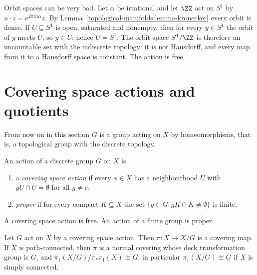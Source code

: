 \begin{counterexample}\label{topological-manifolds:counterexample-irrational-rotation}
Orbit spaces can be very bad. Let $\alpha$ be irrational and let $\ZZ$ act on $S^1$ by $n \cdot z = e^{2\pi in\alpha}z$. By Lemma~\ref{topological-manifolds:lemma-kronecker} every orbit is dense. If $U \subseteq S^1$ is open, saturated and
nonempty, then for every $y \in S^1$ the orbit of $y$ meets $U$, so $y \in U$; hence $U = S^1$. The orbit space $S^1/\ZZ$ is therefore an uncountable set with the indiscrete topology: it is not Hausdorff, and every map from it to a
Hausdorff space is constant. The action is free.
\end{counterexample}

\section{Covering space actions and quotients}\label{topological-manifolds:section-quotients}

From now on in this section $G$ is a group acting on $X$ by homeomorphisms, that is, a topological group with the discrete topology.

\begin{definition}\label{topological-manifolds:definition-covering-action}
An action of a discrete group $G$ on $X$ is
\begin{enumerate}
\item a \emph{covering space action} if every $x \in X$ has a neighbourhood $U$ with $gU \cap U = \emptyset$ for all $g \neq e$;
\item \emph{proper} if for every compact $K \subseteq X$ the set $\{g \in G : gK \cap K \neq \emptyset\}$ is finite.
\end{enumerate}
\end{definition}

A covering space action is free. An action of a finite group is proper.

\begin{theorem}\label{topological-manifolds:theorem-covering-action}
Let $G$ act on $X$ by a covering space action. Then $\pi \colon X \to X/G$ is a covering map. If $X$ is path-connected, then $\pi$ is a normal covering whose deck transformation group is $G$, and
$\pi_1(X/G)/\pi_*\pi_1(X) \cong G$; in particular $\pi_1(X/G) \cong G$ if $X$ is simply connected.
\end{theorem}

